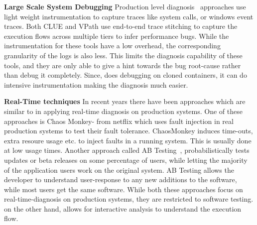 \noindent
\textbf{Large Scale System Debugging}
Production level diagnosis~\cite{magpie,clue,vpath} approaches use light weight instrumentation to capture traces like system calls, or windows event traces.
Both CLUE and VPath use end-to-end trace stitching to capture the execution flows across multiple tiers to infer performance bugs.
While the instrumentation for these tools have a low overhead, the corresponding granularity of the logs is also less.
This limits the diagnosis capability of these tools, and they are only able to give a hint towards the bug root-cause rather than debug it completely.
Since, \parikshan does debugging on cloned containers, it can do intensive instrumentation making the diagnosis much easier.

\noindent
\textbf{Real-Time techniques}
In recent years there have been approaches which are similar to \parikshan in applying real-time diagnosis on production systems.
One of these approaches is Chaos Monkey-\cite{chaosmonkey} from netflix which uses fault injection in real production systems to test their fault tolerance.
ChaosMonkey induces time-outs, extra resoure usage etc. to inject faults in a running system. 
This is usually done at low usage times.
Another approach called AB Testing~\cite{abtesting}, probabilistically tests updates or beta releases on some percentage of users, while letting the majority of the application users work on the original system.
AB Testing allows the developer to understand user-response to any new additions to the software, while most users get the same software.
While both these approaches focus on real-time-diagnosis on production systems, they are restricted to software testing.
\parikshan on the other hand, allows for interactive analysis to understand the execution flow.
  
  
  